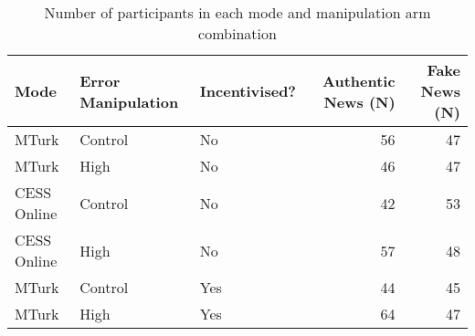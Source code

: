 \begin{table}[ht]
\centering
\begin{tabular}{lllrr}
  \hline
Mode & Error Manipulation & Incentivised? & Authentic News (N) & Fake News (N) \\ 
  \hline
MTurk & Control & No &  56 &  47 \\ 
  MTurk & High & No &  46 &  47 \\ 
  CESS Online & Control & No &  42 &  53 \\ 
  CESS Online & High & No &  57 &  48 \\ 
   \hline
MTurk & Control & Yes &  44 &  45 \\ 
  MTurk & High & Yes &  64 &  47 \\ 
   \hline
\end{tabular}
\caption{Number of participants in each mode and manipulation arm combination} 
\end{table}
